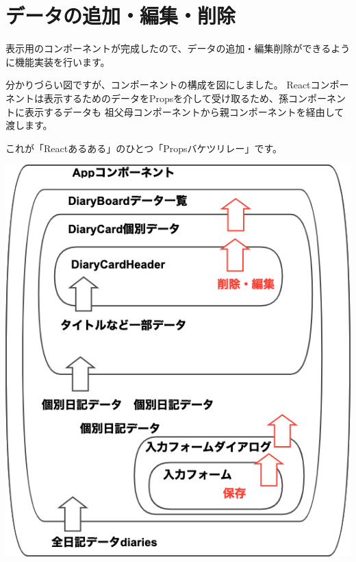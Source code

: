 \section{データの追加・編集・削除}
\keeplastskip{
  \label{sec:3-4}
  \label{sec-034hooks}
  \par\nobreak
}

表示用のコンポーネントが完成したので、データの追加・編集削除ができるように機能実装を行います。

\vspace*{\baselineskip}

分かりづらい図ですが、コンポーネントの構成を図にしました。
Reactコンポーネントは表示するためのデータをPropsを介して受け取るため、孫コンポーネントに表示するデータも
祖父母コンポーネントから親コンポーネントを経由して渡します。

\vspace*{\baselineskip}

これが「Reactあるある」のひとつ「Propsバケツリレー」です。

\begin{reviewimage}[H]%
\includegraphics[width=0.7\maxwidth]{./images/03-todo-with-react/AppComponents.png}%
\label{image:03-todo-with-react:AppComponents}
\end{reviewimage}

